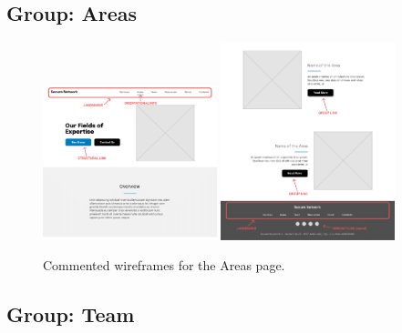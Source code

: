 \documentclass[12pt]{report}
\begin{document}
\subsection{Group: Areas}

\begin{figure}[H]
	\centering
	\includegraphics[width=0.45\textwidth]{low_fid_wireframes/all_areas/1.png}
	\includegraphics[width=0.45\textwidth]{low_fid_wireframes/all_areas/2.png}
	\caption{Commented wireframes for the Areas page.}
\end{figure}

\subsection{Group: Team}
\end{document}
